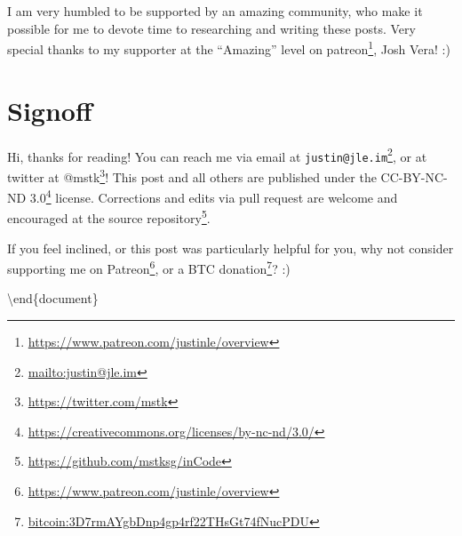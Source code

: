 \documentclass[]{article}
\renewcommand{\href}[2]{#2\footnote{\url{#1}}}
\begin{document}
I am very humbled to be supported by an amazing community, who make it possible
for me to devote time to researching and writing these posts. Very special
thanks to my supporter at the ``Amazing'' level on
\href{https://www.patreon.com/justinle/overview}{patreon}, Josh Vera! :)

\section{Signoff}\label{signoff}

Hi, thanks for reading! You can reach me via email at
\href{mailto:justin@jle.im}{\nolinkurl{justin@jle.im}}, or at twitter at
\href{https://twitter.com/mstk}{@mstk}! This post and all others are published
under the \href{https://creativecommons.org/licenses/by-nc-nd/3.0/}{CC-BY-NC-ND
3.0} license. Corrections and edits via pull request are welcome and encouraged
at \href{https://github.com/mstksg/inCode}{the source repository}.

If you feel inclined, or this post was particularly helpful for you, why not
consider \href{https://www.patreon.com/justinle/overview}{supporting me on
Patreon}, or a \href{bitcoin:3D7rmAYgbDnp4gp4rf22THsGt74fNucPDU}{BTC donation}?
:)

\textbackslash end\{document\}
\end{document}
